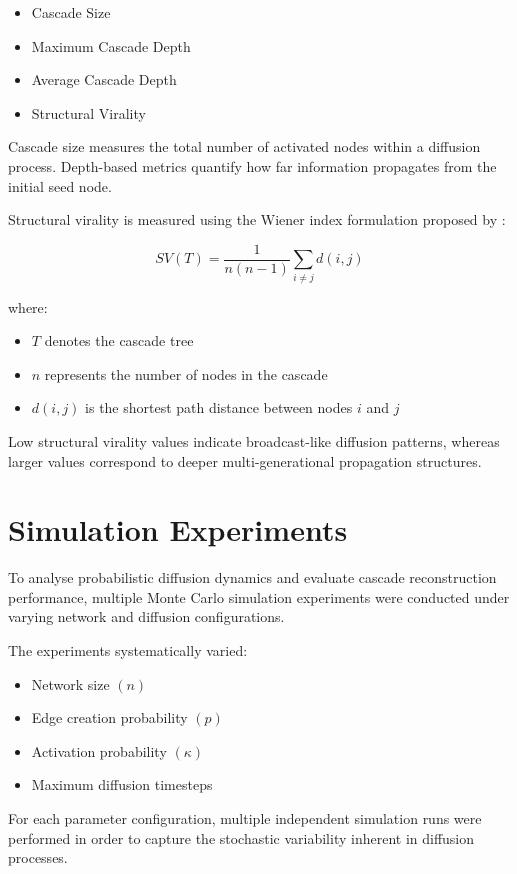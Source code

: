 \documentclass{article}
\begin{document}
\begin{itemize}
    \item Cascade Size
    \item Maximum Cascade Depth
    \item Average Cascade Depth
    \item Structural Virality
\end{itemize}

Cascade size measures the total number of activated nodes within a diffusion process. Depth-based metrics quantify how far information propagates from the initial seed node.

Structural virality is measured using the Wiener index formulation proposed by \citet{goel2016structural}:

\[
SV(T) = \frac{1}{n(n-1)} \sum_{i \neq j} d(i,j)
\]

where:

\begin{itemize}
    \item $T$ denotes the cascade tree
    \item $n$ represents the number of nodes in the cascade
    \item $d(i,j)$ is the shortest path distance between nodes $i$ and $j$
\end{itemize}

Low structural virality values indicate broadcast-like diffusion patterns, whereas larger values correspond to deeper multi-generational propagation structures.
\section{Simulation Experiments}

To analyse probabilistic diffusion dynamics and evaluate cascade reconstruction performance, multiple Monte Carlo simulation experiments were conducted under varying network and diffusion configurations.

The experiments systematically varied:

\begin{itemize}
    \item Network size $(n)$
    \item Edge creation probability $(p)$
    \item Activation probability $(\kappa)$
    \item Maximum diffusion timesteps
\end{itemize}

For each parameter configuration, multiple independent simulation runs were performed in order to capture the stochastic variability inherent in diffusion processes.
\end{document}
